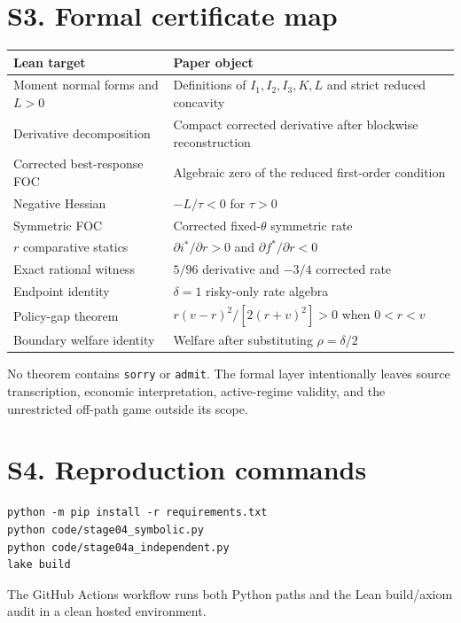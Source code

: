 \documentclass[11pt]{article}
\begin{document}
\section*{S3. Formal certificate map}
\begin{center}
\small
\begin{tabular}{p{}p{}}
\toprule
Lean target & Paper object \\
\midrule
Moment normal forms and $L>0$ & Definitions of $I_1,I_2,I_3,K,L$ and strict reduced concavity \\
Derivative decomposition & Compact corrected derivative after blockwise reconstruction \\
Corrected best-response FOC & Algebraic zero of the reduced first-order condition \\
Negative Hessian & $-L/\tau<0$ for $\tau>0$ \\
Symmetric FOC & Corrected fixed-$\theta$ symmetric rate \\
$r$ comparative statics & $\partial i^*/\partial r>0$ and $\partial f^*/\partial r<0$ \\
Exact rational witness & $5/96$ derivative and $-3/4$ corrected rate \\
Endpoint identity & $\delta=1$ risky-only rate algebra \\
Policy-gap theorem & $r(v-r)^2/[2(r+v)^2]>0$ when $0<r<v$ \\
Boundary welfare identity & Welfare after substituting $\rho=\delta/2$ \\
\bottomrule
\end{tabular}
\end{center}

No theorem contains \texttt{sorry} or \texttt{admit}. The formal layer intentionally leaves source transcription, economic interpretation, active-regime validity, and the unrestricted off-path game outside its scope.

\section*{S4. Reproduction commands}
\begin{verbatim}
python -m pip install -r requirements.txt
python code/stage04_symbolic.py
python code/stage04a_independent.py
lake build
\end{verbatim}
The GitHub Actions workflow runs both Python paths and the Lean build/axiom audit in a clean hosted environment.
\end{document}
